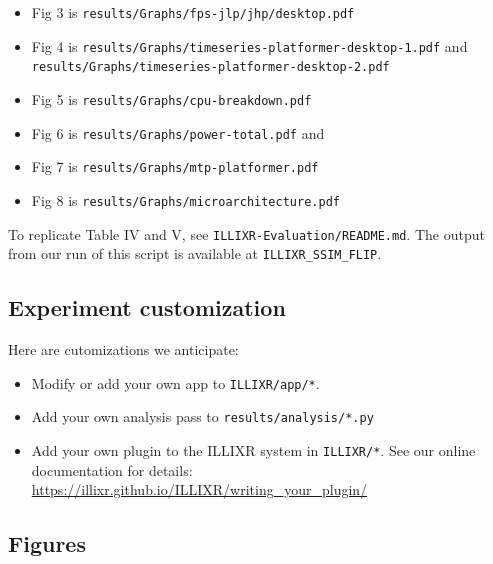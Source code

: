 \documentclass{sigplanconf}
\begin{document}
\begin{itemize}
\item Fig 3 is {\footnotesize\texttt{results/Graphs/fps-jlp/jhp/desktop.pdf}}
\item Fig 4 is {\footnotesize\texttt{results/Graphs/timeseries-platformer-desktop-1.pdf}} and {\footnotesize\texttt{results/Graphs/timeseries-platformer-desktop-2.pdf}}
\item Fig 5 is {\footnotesize\texttt{results/Graphs/cpu-breakdown.pdf}}
\item Fig 6 is {\footnotesize\texttt{results/Graphs/power-total.pdf}} and
\item Fig 7 is {\footnotesize\texttt{results/Graphs/mtp-platformer.pdf}}
\item Fig 8 is {\footnotesize\texttt{results/Graphs/microarchitecture.pdf}}
\end{itemize}

To replicate Table IV and V, see \texttt{ILLIXR-Evaluation/README.md}. The output from our run of this script is available at \texttt{ILLIXR\_SSIM\_FLIP}.

\subsection{Experiment customization}

Here are cutomizations we anticipate:

\begin{itemize}
\item Modify or add your own app to \texttt{ILLIXR/app/*}.
\item Add your own analysis pass to \texttt{results/analysis/*.py}
\item Add your own plugin to the ILLIXR system in \texttt{ILLIXR/*}. See our online documentation for details:\newline
{\footnotesize \url{https://illixr.github.io/ILLIXR/writing_your_plugin/}}
\end{itemize}

\eject

\subsection{Figures}
\end{document}

